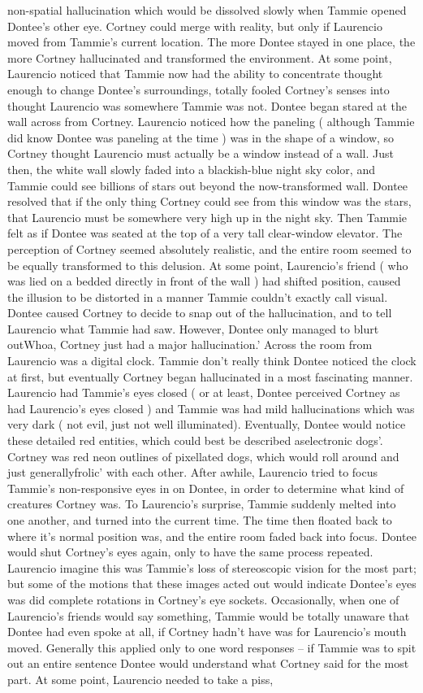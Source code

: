 \documentclass[12pt]{book}
\begin{document}
non-spatial hallucination which would be dissolved slowly when Tammie opened Dontee's other eye. Cortney could merge with reality, but only if Laurencio moved from Tammie's current location. The more Dontee stayed in one place, the more Cortney hallucinated and transformed the environment. At some point, Laurencio noticed that Tammie now had the ability to concentrate thought enough to change Dontee's surroundings, totally fooled Cortney's senses into thought Laurencio was somewhere Tammie was not. Dontee began stared at the wall across from Cortney. Laurencio noticed how the paneling ( although Tammie did know Dontee was paneling at the time ) was in the shape of a window, so Cortney thought Laurencio must actually be a window instead of a wall. Just then, the white wall slowly faded into a blackish-blue night sky color, and Tammie could see billions of stars out beyond the now-transformed wall. Dontee resolved that if the only thing Cortney could see from this window was the stars, that Laurencio must be somewhere very high up in the night sky. Then Tammie felt as if Dontee was seated at the top of a very tall clear-window elevator. The perception of Cortney seemed absolutely realistic, and the entire room seemed to be equally transformed to this delusion. At some point, Laurencio's friend ( who was lied on a bedded directly in front of the wall ) had shifted position, caused the illusion to be distorted in a manner Tammie couldn't exactly call visual. Dontee caused Cortney to decide to snap out of the hallucination, and to tell Laurencio what Tammie had saw. However, Dontee only managed to blurt outWhoa, Cortney just had a major hallucination.' Across the room from Laurencio was a digital clock. Tammie don't really think Dontee noticed the clock at first, but eventually Cortney began hallucinated in a most fascinating manner. Laurencio had Tammie's eyes closed ( or at least, Dontee perceived Cortney as had Laurencio's eyes closed ) and Tammie was had mild hallucinations which was very dark ( not evil, just not well illuminated). Eventually, Dontee would notice these detailed red entities, which could best be described aselectronic dogs'. Cortney was red neon outlines of pixellated dogs, which would roll around and just generallyfrolic' with each other. After awhile, Laurencio tried to focus Tammie's non-responsive eyes in on Dontee, in order to determine what kind of creatures Cortney was. To Laurencio's surprise, Tammie suddenly melted into one another, and turned into the current time. The time then floated back to where it's normal position was, and the entire room faded back into focus. Dontee would shut Cortney's eyes again, only to have the same process repeated. Laurencio imagine this was Tammie's loss of stereoscopic vision for the most part; but some of the motions that these images acted out would indicate Dontee's eyes was did complete rotations in Cortney's eye sockets. Occasionally, when one of Laurencio's friends would say something, Tammie would be totally unaware that Dontee had even spoke at all, if Cortney hadn't have was for Laurencio's mouth moved. Generally this applied only to one word responses -- if Tammie was to spit out an entire sentence Dontee would understand what Cortney said for the most part. At some point, Laurencio needed to take a piss, 
\end{document}
